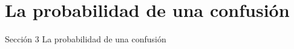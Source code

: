 \documentclass{beamer}
\theoremstyle{plain}
\theoremstyle{example}
\theoremstyle{example}
\begin{document}







\section{La probabilidad de una confusión}


\begin{frame}   \footnotesize
{
\begin{block}{Sección 3}
La probabilidad de una confusión
\end{block}
}
\end{frame} 
\end{document}

